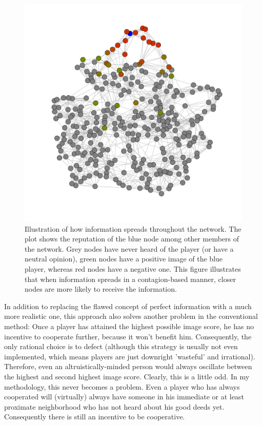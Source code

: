 \documentclass[12pt]{article}
\begin{document}
\begin{figure}
	\centering
	\includegraphics[width=\linewidth]{../figures/illustration_Contagion.pdf}
	\caption{Illustration of how information spreads throughout the network. The plot shows the reputation of the blue node among other members of the network. Grey nodes have never heard of the player (or have a neutral opinion), green nodes have a positive image of the blue player, whereas red nodes have a negative one. This figure illustrates that when information spreads in a contagion-based manner, closer nodes are more likely to receive the information.}
	\label{illustrate_Contagion}
\end{figure}

In addition to replacing the flawed concept of perfect information with a much more realistic one, this approach also solves another problem in the conventional method: Once a player has attained the highest possible image score, he has no incentive to cooperate further, because it won't benefit him. Consequently, the only rational choice is to defect (although this strategy is usually not even implemented, which means players are just downright 'wasteful' and irrational). Therefore, even an altruistically-minded person would always oscillate between the highest and second highest image score. Clearly, this is a little odd. In my methodology, this never becomes a problem. Even a player who has always cooperated will (virtually) always have someone in his immediate or at least proximate neighborhood who has not heard about his good deeds yet. Consequently there is still an incentive to be cooperative.
\end{document}
